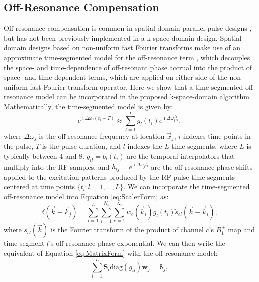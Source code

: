 \subsection*{Off-Resonance Compensation}
Off-resonance compensation is common in spatial-domain parallel pulse designs \cite{Grissom:2006:MRM}, 
but has not been previously implemented in a k-space-domain design.
Spatial domain designs based on non-uniform fast Fourier transforms make use of an approximate time-segmented
model for the off-resonance term \cite{fessler2005toeplitz},
which decouples the space- and time-dependence of off-resonant phase accrual into the product of 
space- and time-dependent terms, which are applied on either side of the non-uniform fast Fourier transform operator. 
Here we show that a time-segmented off-resonance model can be incorporated in the proposed k-space-domain algorithm. 
Mathematically, the time-segmented model is given by:
\begin{equation}
e^{\imath \Delta\omega_j (t_i-T) }\approx\sum_{l=1}^{L} g_l(t_i) e^{\imath \Delta\omega_j \breve{t}_l},
\end{equation}
where $\Delta\omega_j$ is the off-resonance frequency at location $\vec{x}_j$, 
$i$ indexes time points in the pulse, 
$T$ is the pulse duration,
and $l$ indexes the $L$ time segments, where $L$ is typically between 4 and 8. 
$g_{il}=b_{l}(t_i)$ are the temporal interpolators that multiply into the RF samples,
and $h_{lj}=e^{\imath \Delta\omega_j\breve{t}_l}$ are the off-resonance phase shifts 
applied to the excitation patterns produced by the RF pulse time segments centered at time points $\{\breve{t}_l: l = 1, \dots, L\}$.
We can incorporate the time-segmented off-resonance model into Equation \ref{eq:ScalerForm} as:
\begin{equation}
	\delta(\vec{k}-\vec{k}_j)=\sum_{l = 1}^L \sum_{i=1}^{N_t}\sum_{c=1}^{N_c} w_c(\vec{k}_i) g_l(t_i) \tilde{s}_{cl} (\vec{k}-\vec{k}_i), 
\end{equation}
where $\tilde{s}_{cl}(\vec{k})$ is the Fourier transform of the product of channel $c$'s $B_1^+$ map and time segment $l$'s 
off-resonance phase exponential. 
We can then write the equivalent of Equation \ref{eq:MatrixForm} with the off-resonance model:
\begin{equation}
	\sum_{l=1}^L \bm{S}_l \textrm{diag}(g_{il}) \bm{w}_j = \bm{\delta}_j,
\end{equation} 
